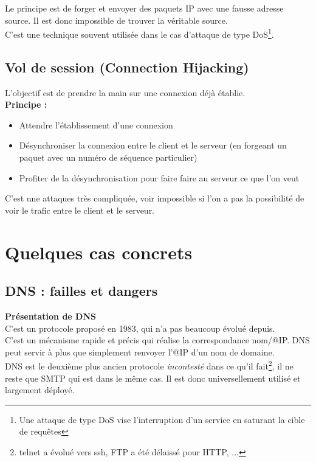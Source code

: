 \documentclass[journal, a4paper]{IEEEtran}
\begin{document}
		Le principe est de forger et envoyer des paquets IP avec une fausse adresse source. Il est donc impossible de trouver la véritable source.\\
		C'est une technique souvent utilisée dans le cas d'attaque de type DoS\footnote{Une attaque de type DoS vise l'interruption d'un service en saturant la cible de requêtes}.

	\subsection{Vol de session (Connection Hijacking)}

		L'objectif est de prendre la main sur une connexion déjà établie.\\
		\textbf{Principe : }
		\begin{itemize}
			\item Attendre l'établissement d'une connexion
			\item Désynchroniser la connexion entre le client et le serveur (en forgeant un paquet avec un numéro de séquence particulier)
			\item Profiter de la désynchronisation pour faire faire au serveur ce que l'on veut
		\end{itemize}
		C'est une attaques très compliquée, voir impossible si l'on a pas la possibilité de voir le trafic entre le client et le serveur.

\section{Quelques cas concrets}

	\subsection{DNS : failles et dangers}
		
		\textbf{Présentation de DNS}\\
		C'est un protocole proposé en 1983, qui n'a pas beaucoup évolué depuis.\\
		C'est un mécanisme rapide et précis qui réalise la correspondance nom/@IP. DNS peut servir à plus que simplement renvoyer l'@IP d'un nom de domaine.\\
		DNS est le deuxième plus ancien protocole \textit{incontesté} dans ce qu'il fait\footnote{telnet a évolué vers ssh, FTP a été délaissé pour HTTP, ...}, il ne reste que SMTP qui est dans le même cas. Il est donc universellement utilisé et largement déployé.
		
\end{document}
